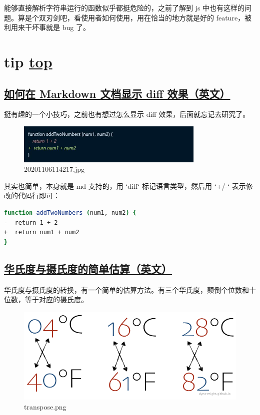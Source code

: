 能够直接解析字符串运行的函数似乎都挺危险的，之前了解到 js 中也有这样的问题。算是个双刃剑吧，看使用者如何使用，用在恰当的地方就是好的 feature，被利用来干坏事就是 bug 了。

\section{tip \hyperref[chap:w1]{top}}\label{w1:tip}

\subsection{\href{https://blog.alispit.tel/create-a-git-diff-in-markdown}{如何在 Markdown 文档显示 diff 效果（英文）}}

挺有趣的一个小技巧，之前也有想过怎么显示 diff 效果，后面就忘记去研究了。

\begin{figure}[htbp]
	\centering
	\includegraphics[width=0.8\textwidth]{../images/2020/11/20201106114217}
	\caption{20201106114217.jpg}
\end{figure}

其实也简单，本身就是 md 支持的，用 `diff` 标记语言类型，然后用 `+/-` 表示修改的代码行即可：

\begin{lstlisting}[language=Bash]
function addTwoNumbers (num1, num2) {
-  return 1 + 2
+  return num1 + num2
}
\end{lstlisting}

\subsection{\href{https://dyno-might.github.io/2020/10/30/temperature-conversion-for-the-lazy-and-simple-minded}{华氏度与摄氏度的简单估算（英文）}}

华氏度与摄氏度的转换，有一个简单的估算方法。有三个华氏度，颠倒个位数和十位数，等于对应的摄氏度。

\begin{figure}[htbp]
\centering
\includegraphics[width=\textwidth]{../images/2020/11/transpose}
\caption{transpose.png}
\end{figure}

